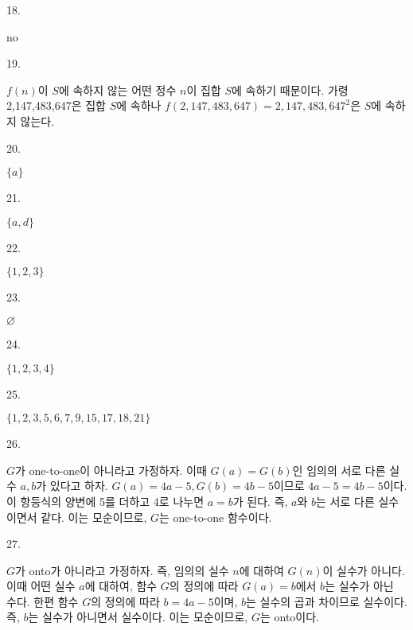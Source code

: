 \documentclass{article}
\begin{document}
18.
\begin{addmargin}[1em]{2em}
no

\end{addmargin}
\bigskip

19.
\begin{addmargin}[1em]{2em}
$f(n)$이 $S$에 속하지 않는 어떤 정수 $n$이 집합 $S$에 속하기 때문이다. 가령 2,147,483,647은 집합 $S$에 속하나 $f(2,147,483,647)=2,147,483,647^2$은 $S$에 속하지 않는다.
\end{addmargin}
\bigskip

20.
\begin{addmargin}[1em]{2em}
$\{a\}$
\end{addmargin}
\bigskip

21.
\begin{addmargin}[1em]{2em}
$\{a, d\}$
\end{addmargin}
\bigskip

22.
\begin{addmargin}[1em]{2em}
$\{1, 2, 3\}$
\end{addmargin}
\bigskip

23.
\begin{addmargin}[1em]{2em}
$\varnothing$
\end{addmargin}
\bigskip

24.
\begin{addmargin}[1em]{2em}
$\{1,2,3,4\}$
\end{addmargin}
\bigskip

25.
\begin{addmargin}[1em]{2em}
$\{1, 2, 3, 5, 6, 7, 9, 15, 17, 18, 21\}$
\end{addmargin}
\bigskip

26.
\begin{addmargin}[1em]{2em}
$G$가 one-to-one이 아니라고 가정하자. 이때 $G(a)=G(b)$인 임의의 서로 다른 실수 $a, b$가 있다고 하자. $G(a)=4a-5, G(b)=4b-5$이므로 $4a-5=4b-5$이다. 이 항등식의 양변에 5를 더하고 4로 나누면 $a=b$가 된다. 즉, $a$와 $b$는 서로 다른 실수이면서 같다. 이는 모순이므로, $G$는 one-to-one 함수이다.
\end{addmargin}
\bigskip

27.
\begin{addmargin}[1em]{2em}
$G$가 onto가 아니라고 가정하자. 즉, 임의의 실수 $n$에 대하여 $G(n)$이 실수가 아니다. 
이때 어떤 실수 $a$에 대하여, 함수 $G$의 정의에 따라 $G(a)=b$에서 $b$는 실수가 아닌 수다. 한편 함수 $G$의 정의에 따라 $b=4a-5$이며, $b$는 실수의 곱과 차이므로 실수이다. 즉, $b$는 실수가 아니면서 실수이다. 이는 모순이므로, $G$는 onto이다. 
\end{addmargin}
\bigskip
\end{document}

